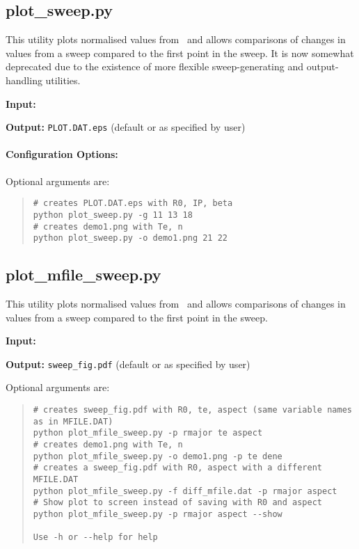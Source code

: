 \subsection{plot\_sweep.py}

This utility plots normalised values from \plotdat\ and allows comparisons of
changes in values from a sweep compared to the first point in the sweep. It is
now somewhat deprecated due to the existence of more flexible sweep-generating
and output-handling utilities.

\begin{description}
\item{\textbf{Input:}}
 \plotdat\
                                
\item{\textbf{Output:}}
\texttt{PLOT.DAT.eps} (default or as specified by user)
\end{description}

\paragraph{Configuration Options:}

Optional arguments are:
\begin{quote}
\begin{verbatim}
# creates PLOT.DAT.eps with R0, IP, beta
python plot_sweep.py -g 11 13 18 
# creates demo1.png with Te, n
python plot_sweep.py -o demo1.png 21 22
\end{verbatim}
\end{quote}

\subsection{plot\_mfile\_sweep.py}

This utility plots normalised values from \mfile\ and allows comparisons of
changes in values from a sweep compared to the first point in the sweep.

\begin{description}
\item{\textbf{Input:}}
 \mfile
                                
\item{\textbf{Output:}}
\texttt{sweep\_fig.pdf} (default or as specified by user)
\end{description}

Optional arguments are:
\begin{quote}
\begin{verbatim}
# creates sweep_fig.pdf with R0, te, aspect (same variable names as in MFILE.DAT)
python plot_mfile_sweep.py -p rmajor te aspect
# creates demo1.png with Te, n
python plot_mfile_sweep.py -o demo1.png -p te dene
# creates a sweep_fig.pdf with R0, aspect with a different MFILE.DAT
python plot_mfile_sweep.py -f diff_mfile.dat -p rmajor aspect
# Show plot to screen instead of saving with R0 and aspect
python plot_mfile_sweep.py -p rmajor aspect --show

Use -h or --help for help

\end{verbatim}
\end{quote}

